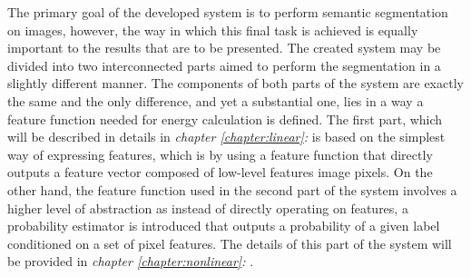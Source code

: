 The primary goal of the developed system is to perform semantic segmentation on images, however, the way in which this final task is achieved is equally important to the results that are to be presented. The created system may be divided into two interconnected parts aimed to perform the segmentation in a slightly different manner. The components of both parts of the system are exactly the same and the only difference, and yet a substantial one, lies in a way a feature function needed for energy calculation is defined. The first part, which will be described in details in \textit{chapter \ref{chapter:linear}: } is based on the simplest way of expressing features, which is by using a feature function that directly outputs a feature vector composed of low-level features image pixels. On the other hand, the feature function used in the second part of the system involves a higher level of abstraction as instead of directly operating on features, a probability estimator is introduced that outputs a probability of a given label conditioned on a set of pixel features. The details of this part of the system will be provided in \textit{chapter \ref{chapter:nonlinear}: }.